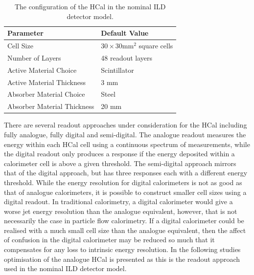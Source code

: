 \begin{table}[h!]
\centering
\begin{tabular}{ l l}
\hline
Parameter & Default Value \\
\hline
Cell Size & $30 \times 30 \text{mm}^{2}$ square cells \\
Number of Layers & 48 readout layers \\
Active Material Choice & Scintillator \\
Active Material Thickness & 3 mm  \\
Absorber Material Choice & Steel \\
Absorber Material Thickness & 20 mm \\
\hline
\end{tabular}
\caption[The configuration of the HCal in the nominal ILD detector model.]{The configuration of the HCal in the nominal ILD detector model.}
\label{table:defaultildhcal}
\end{table}

There are several readout approaches under consideration for the HCal including fully analogue, fully digital and semi-digital.  The analogue readout measures the energy within each HCal cell using a continuous spectrum of measurements, while the digital readout only produces a response if the energy deposited within a calorimeter cell is above a given threshold.  The semi-digital approach mirrors that of the digital approach, but has three responses each with a different energy threshold.  While the energy resolution for digital calorimeters is not as good as that of analogue calorimeters, it is possible to construct smaller cell sizes using a digital readout.  In traditional calorimetry, a digital calorimeter would give a worse jet energy resolution than the analogue equivalent, however, that is not necessarily the case in particle flow calorimetry.  If a digital calorimeter could be realised with a much small cell size than the analogue equivalent, then the affect of confusion in the digital calorimeter may be reduced so much that it compensates for any loss to intrinsic energy resolution.  In the following studies optimisation of the analogue HCal is presented as this is the readout approach used in the nominal ILD detector model.  


